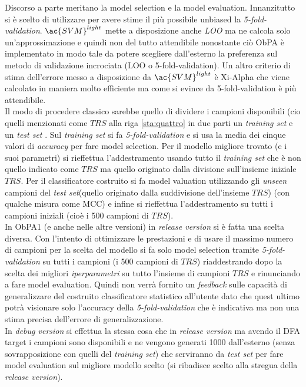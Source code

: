 Discorso a parte meritano la model selection e la model evaluation. Innanzitutto  si è scelto di utilizzare per avere stime il più possibile unbiased la \textit{5-fold-validation}. $\ac{SVM}^{light}$ mette a disposizione anche \textit{LOO} ma ne calcola solo un'approssimazione e quindi non del tutto attendibile nonostante ciò  \ac{ObPA} è implementato in modo tale da potere scegliere dall'esterno la preferenza sul metodo di validazione incrociata (LOO o 5-fold-validation).  Un altro criterio di stima dell'errore messo a disposizione da $\ac{SVM}^{light}$ è  Xi-Alpha che viene calcolato in maniera molto efficiente ma come si evince da \cite{Duan03} 5-fold-validation è più attendibile.  \\Il modo di procedere classico sarebbe quello di dividere i campioni disponibili (cio quelli menzionati come $TRS$ alla riga \ref{sta:quattro} in due parti un \textit{training set} e un \textit{test set} . Sul \textit{training set} si fa \textit{5-fold-validation} e si usa la media dei cinque valori di \textit{accuracy} per fare model selection. Per il modello migliore trovato (e i suoi parametri) si rieffettua l'addestramento usando tutto il \textit{training set} che è non quello indicato come $TRS$ ma quello originato dalla divisione sull'insieme iniziale $TRS$. Per il classificatore costruito si fa model valuation utilizzando gli \textit{unseen} campioni del \textit{test set}(quello originato dalla suddivisione dell'insieme $TRS$) (con qualche misura come MCC)  e infine si rieffettua l'addestramento su tutti i campioni  iniziali (cioè i 500 campioni di $TRS$). \\
In \ac{ObPA}1 (e anche nelle altre versioni) in \textit{release version} si è fatta una scelta diversa. Con l'intento di ottimizzare le prestazioni e di usare il massimo numero di campioni per la scelta del modello si fa solo model selection tramite \textit{5-fold-validation} su tutti i campioni (i 500 campioni di $TRS$) riaddestrando dopo la scelta dei migliori \textit{iperparametri} su tutto l'insieme di campioni $TRS$ e rinunciando a fare model evaluation. Quindi non verrà fornito un \textit{feedback}  sulle capacità di generalizzare del costruito classificatore statistico all'utente dato che quest ultimo potrà visionare solo l'accuracy della \textit{5-fold-validation} che è indicativa ma non una stima precisa dell'errore di generalizzazione.\\
In \textit{debug version} si effettua la stessa cosa che in \textit{release version} ma avendo il \ac{DFA} target i campioni sono disponibili e ne vengono generati 1000 dall'esterno (senza sovrapposizione con quelli del \textit{training set}) che serviranno da \textit{test set} per fare model evaluation sul migliore modello scelto (si ribadisce scelto alla stregua della \textit{release version}).\\
